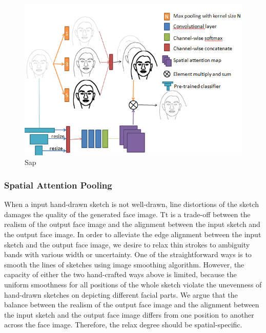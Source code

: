 
% 
\begin{figure}
	\includegraphics[width=\columnwidth]{figs/sap.png}
	\caption{Sap}
	\label{fig:sap}
\end{figure}
%

\subsubsection{Spatial Attention Pooling}
\label{subsec:algorithm_sap}
When a input hand-drawn sketch is not well-drawn, line distortions of the sketch damages the quality of the generated face image. Tt is a trade-off between the realism of the output face image and the alignment between the input sketch and the output face image.
%
In order to alleviate the edge alignment between the input sketch and the output face image, we desire to relax thin strokes to ambiguity bands with various width or uncertainty.
One of the straightforward ways is to smooth the lines of sketches using image smoothing algorithm. 
%
However, the capacity of either the two hand-crafted ways above is limited, because the uniform smoothness  for all positions of the whole sketch violate the unevenness of hand-drawn sketches on depicting different facial parts. 
%
We argue that the balance between the realism of the output face image and the alignment between the input sketch and the output face image differs from one position to another across the face image. Therefore, the relax degree should be spatial-specific. 

